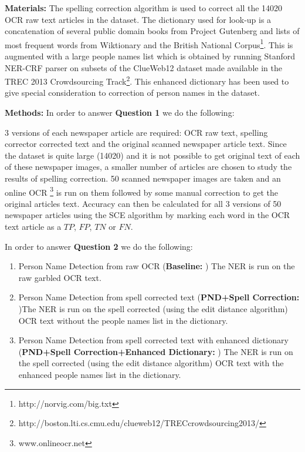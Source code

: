 \documentclass[letterpaper,11pt]{report}
\begin{document}
\noindent \textbf{Materials: }
The spelling correction algorithm is used to correct all the 14020 OCR raw text articles in the dataset. The dictionary used for look-up is a concatenation of several public domain books from Project Gutenberg and lists of most frequent words from Wiktionary and the British National Corpus\footnote{http://norvig.com/big.txt}. This is augmented with a large people names list which is obtained  by running Stanford NER-CRF parser on subsets of the ClueWeb12 dataset made available in the TREC 2013 Crowdsourcing Track\footnote{http://boston.lti.cs.cmu.edu/clueweb12/TRECcrowdsourcing2013/}. This enhanced dictionary has been used to give special consideration to correction of person names in the dataset.

\noindent \textbf{Methods: }
In order to answer \textbf{Question 1} we do the following: 

3 versions of each newspaper article are required: OCR raw text, spelling corrector corrected text and the original scanned newspaper article text. Since the dataset is quite large (14020) and it is not possible to get original text of each of these newspaper images, a smaller number of articles are chosen to study the results of spelling correction. 50 scanned newspaper images are taken and an online OCR \footnote{www.onlineocr.net} is run on them followed by some manual correction to get the original articles text. Accuracy can then be calculated for all 3 versions of 50 newspaper articles using the SCE algorithm by marking each word in the OCR text article as a $TP$, $FP$, $TN$ or $FN$. 

In order to answer \textbf{Question 2} we do the following: 
\begin{enumerate}
\item Person Name Detection from raw OCR (\textbf{Baseline: }) The NER is run on the raw garbled OCR text.
\item Person Name Detection from spell corrected text (\textbf{PND+Spell Correction: })The NER is run on the spell corrected (using the edit distance algorithm) OCR text without the people names list in the dictionary.
\item Person Name Detection from spell corrected text with enhanced dictionary (\textbf{PND+Spell Correction+Enhanced Dictionary: }) The NER is run on the spell corrected (using the edit distance algorithm) OCR text with the enhanced people names list in the dictionary.

\end{enumerate}
\end{document}
